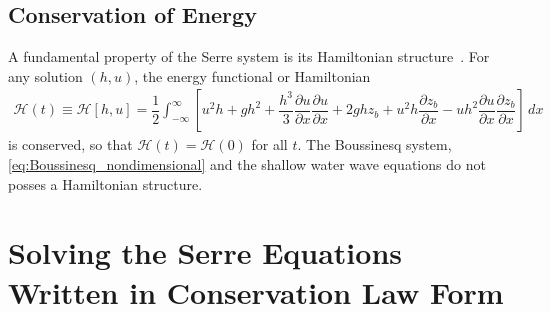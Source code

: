 \documentclass[preprint,sort&compress,1p]{article}
\begin{document}
\subsection{Conservation of Energy}
\label{section:Conservation of Energy}

A fundamental property of the Serre system is its Hamiltonian structure~\cite{Li-Y-2006-1255}. For any solution $(h,u)$, the energy functional or Hamiltonian~\cite{Green-Naghdi-1976-237}
\begin{align}\label{eq:Hamiltonian}
\mathcal{H}(t) \equiv \mathcal{H}[h,u] = \dfrac{1}{2} \int_{-\infty}^\infty  \left [ u^2 h + gh^2 + \dfrac{h^3}{3} \dfrac{\partial u}{\partial x} \dfrac{\partial u}{\partial x} + 2ghz_b + u^2h \dfrac{\partial z_b}{\partial x} - uh^2 \dfrac{\partial u}{\partial x} \dfrac{\partial z_b}{\partial x}\right ] \, dx
\end{align}
is conserved, so that $\mathcal{H}(t) = \mathcal{H}(0)$ for all $t$. The Boussinesq system, \eqref{eq:Boussinesq_nondimensional} and the shallow water wave equations do not posses a Hamiltonian structure.

\section{Solving the Serre Equations Written in Conservation Law Form}
\label{section:Solving the Serre Equations Written in Conservation Law Form}
\end{document}
